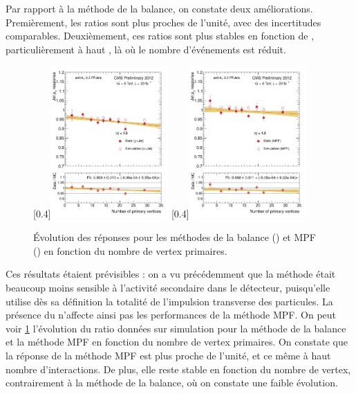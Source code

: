 Par rapport à la méthode de la balance, on constate deux améliorations. Premièrement, les ratios sont plus proches de l'unité, avec des incertitudes comparables. Deuxièmement, ces ratios sont plus stables en fonction de \aeta, particulièrement à haut \aeta, là où le nombre d'événements est réduit.

\begin{figure}[tbp]
    \centering
    \subcaptionbox{\label{fig:npv_bal_eta013}}[0.4\textwidth]{\includegraphics[width=0.4\textwidth]{chapitre4/figs/resp_vs_npv/resp_balancing_eta013_vs_npv_FITLINE.pdf}}\qquad
    \subcaptionbox{\label{fig:npv_mpf_eta013}}[0.4\textwidth]{\includegraphics[width=0.4\textwidth]{chapitre4/figs/resp_vs_npv/resp_mpf_eta013_vs_npv_FITLINE.pdf}}
    \caption{Évolution des réponses pour les méthodes de la balance () et MPF () en fonction du nombre de vertex primaires.}
    \label{fig:resp_vs_npv}
\end{figure}

Ces résultats étaient prévisibles : on a vu précédemment que la méthode était beaucoup moins sensible à l'activité secondaire dans le détecteur, puisqu'elle utilise dès sa définition la totalité de l'impulsion transverse des particules. La présence du \pu n'affecte ainsi pas les performances de la méthode MPF. On peut voir \cref{fig:resp_vs_npv} l'évolution du ratio données sur simulation pour la méthode de la balance et la méthode MPF en fonction du nombre de vertex primaires. On constate que la réponse de la méthode MPF est plus proche de l'unité, et ce même à haut nombre d'interactions. De plus, elle reste stable en fonction du nombre de vertex, contrairement à la méthode de la balance, où on constate une faible évolution.

